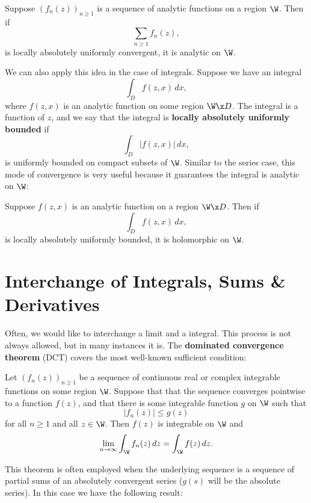    \begin{theorem}
      Suppose $(f_{n}(z))_{n \ge 1}$ is a sequence of analytic functions on a region $\W$. Then if
      \[
        \sum_{n \ge 1}f_{n}(z),
      \]
      is locally absolutely uniformly convergent, it is analytic on $\W$.
    \end{theorem}

    We can also apply this idea in the case of integrals. Suppose we have an integral
    \[
      \int_{D}f(z,x)\,dx,
    \]
    where $f(z,x)$ is an analytic function on some region $\W \x D$. The integral is a function of $z$, and we say that the integral is \textbf{locally absolutely uniformly bounded} if
    \[
      \int_{D}|f(z,x)|\,dx,
    \]
    is uniformly bounded on compact subsets of $\W$. Similar to the series case, this mode of convergence is very useful because it guarantees the integral is analytic on $\W$:

    \begin{theorem}\label{thm:analytic_integral}
      Suppose $f(z,x)$ is an analytic function on a region $\W \x D$. Then if
      \[
        \int_{D}f(z,x)\,dx,
      \]
      is locally absolutely uniformly bounded, it is holomorphic on $\W$.
    \end{theorem}
  \section{Interchange of Integrals, Sums \& Derivatives}
    Often, we would like to interchange a limit and a integral. This process is not always allowed, but in many instances it is. The \textbf{dominated convergence theorem} (DCT) covers the most well-known sufficient condition:

    \begin{theorem}
      Let $(f_{n}(z))_{n \ge 1}$ be a sequence of continuous real or complex integrable functions on some region $\W$. Suppose that that the sequence converges pointwise to a function $f(z)$, and that there is some integrable function $g$ on $\W$ such that
      \[
        |f_{n}(z)| \le g(z)
      \]
      for all $n \ge 1$ and all $z \in \W$. Then $f(z)$ is integrable on $\W$ and
      \[
        \lim_{n \to \infty}\int_{\W}f_{n}(z)\,dz = \int_{\W}f(z)\,dz.
      \]
    \end{theorem}

    This theorem is often employed when the underlying sequence is a sequence of partial sums of an absolutely convergent series ($g(s)$ will be the absolute series). In this case we have the following result:

